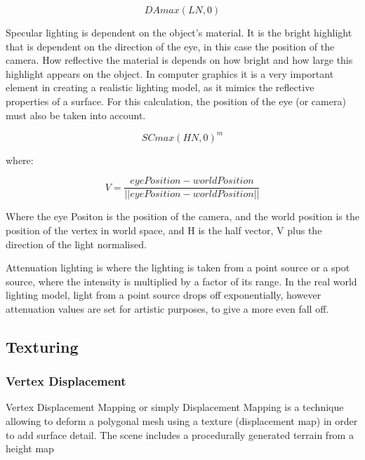 \documentclass[conference]{acmsiggraph}
\begin{document}
\begin{equation} \label{diffuseLightingEq}
    DA max(L N, 0)
\end{equation}

Specular lighting is dependent on the object's material. It is the bright highlight that is dependent on the direction of the eye, in this case the position of the camera. How reflective the material is depends on how bright and how large this highlight appears on the object. In computer graphics it is a very important element in creating a realistic lighting model, as it mimics the reflective properties of a surface. %
For this calculation, the position of the eye (or camera) must also be taken into account. 

\begin{equation}
    SC max(H N, 0)^m
\end{equation}

where:

\begin{equation} 
    V = \frac{eyePosition - worldPosition}{||eyePosition - worldPosition||}
\end{equation}

Where the eye Positon is the position of the camera, and the world position is the position of the vertex in world space, and H is the half vector, V plus the direction of the light normalised.

Attenuation lighting is where the lighting is taken from a point source or a spot source, where the intensity is multiplied by a factor of its range. In the real world lighting model, light from a point source drops off exponentially, however attenuation values are set for artistic purposes, to give a more even fall off. 

\subsection{Texturing}

\subsubsection{Vertex Displacement}

Vertex Displacement Mapping or simply Displacement Mapping is a technique allowing to deform a polygonal mesh using a texture (displacement map) in order to add surface detail. The scene includes a procedurally generated terrain from a height map %
\end{document}
